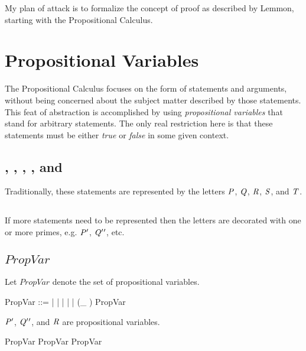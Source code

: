 \documentclass[11pt, oneside]{article}
\begin{document}
My plan of attack is to formalize the concept of proof as described by Lemmon, starting with
the Propositional Calculus.

\section{Propositional Variables}

The Propositional Calculus focuses on the form of statements and arguments, without being concerned about the subject matter
described by those statements.
This feat of abstraction is accomplished by using {\it propositional variables} that stand for arbitrary statements.
The only real restriction here is that these statements must be either {\it true} or {\it false} in some given context.

\subsection{, , , , and }

Traditionally, these statements are represented by the letters $\mathit{P}$, $\mathit{Q}$, $\mathit{R}$, $\mathit{S}$, and $\mathit{T}$.

\subsection{}

If more statements need to be represented then the letters are decorated with one or more primes, 
e.g. $\mathit{P} {'}$, $\mathit{Q} {'} {'}$, etc.

\subsection{$PropVar$}

Let $PropVar$ denote the set of propositional variables.

\begin{zed}
	PropVar ::= \propP | \propQ | \propR | \propS | \propT | (\_ \propPrime) \ldata PropVar \rdata
\end{zed}

\begin{example}
$\mathit{P} {'}$, $\mathit{Q} {'} {'}$, and $\mathit{R}$ are propositional variables.

\begin{zed}
	\propP \propPrime \in PropVar
\also
	\propQ \propPrime \propPrime \in PropVar
\also
	\propR \in PropVar
\end{zed}

\end{example}

\printbibliography
\end{document}
